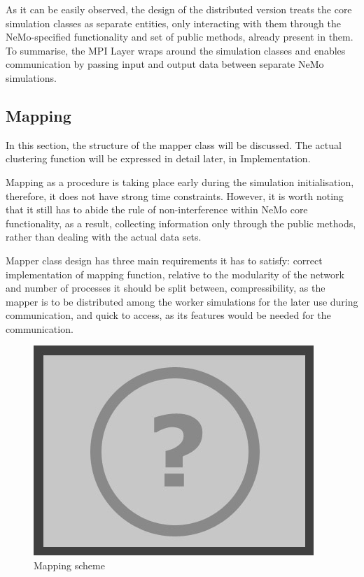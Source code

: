 As it can be easily observed, the design of the distributed version treats the core simulation classes as separate entities, only interacting with them through the NeMo-specified functionality and set of public methods, already present in them. To summarise, the MPI Layer wraps around the simulation classes and enables communication by passing input and output data between separate NeMo simulations.

\subsection{Mapping}

In this section, the structure of the mapper class will be discussed. The actual clustering function will be expressed in detail later, in Implementation.

Mapping as a procedure is taking place early during the simulation initialisation, therefore, it does not have strong time constraints. However, it is worth noting that it still has to abide the rule of non-interference within NeMo core functionality, as a result, collecting information only through the public methods, rather than dealing with the actual data sets.

Mapper class design has three main requirements it has to satisfy: correct implementation of mapping function, relative to the modularity of the network and number of processes it should be split between, compressibility, as the mapper is to be distributed among the worker simulations for the later use during communication, and quick to access, as its features would be needed for the communication.

\begin{figure}[h]
\begin{center}
\includegraphics[scale = 0.5]{images/placeholder.png}
\end{center}
\caption{Mapping scheme}
\end{figure}

